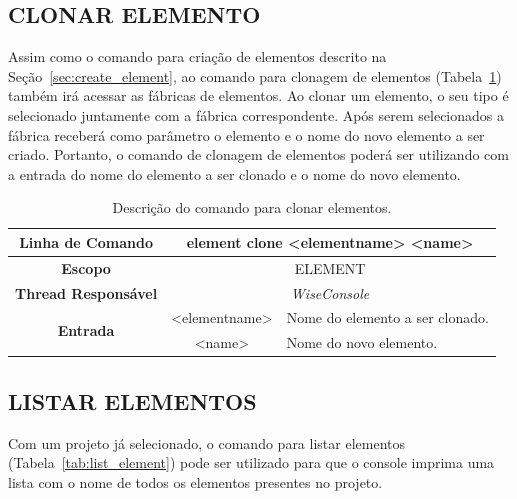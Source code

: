 \subsection{CLONAR ELEMENTO}\label{sec:clone_element}

Assim como o comando para criação de elementos descrito na Seção~\ref{sec:create_element}, ao comando para clonagem de elementos (Tabela~\ref{tab:clone_element}) também irá acessar as fábricas de elementos. Ao clonar um elemento, o seu tipo é selecionado juntamente com a fábrica correspondente. Após serem selecionados a fábrica receberá como parâmetro o elemento e o nome do novo elemento a ser criado. Portanto, o comando de clonagem de elementos poderá ser utilizando com a entrada do nome do elemento a ser clonado e o nome do novo elemento.

\begin{center}
	\begin{table}[!htbp]
		\begin{tabularx}{\textwidth}{c|c|X}
			\toprule
			\textbf{Linha de Comando} & \multicolumn{2}{c}{element clone <element\underline{\space\space}name> <name>} \\
			\midrule
			\textbf{Escopo} & \multicolumn{2}{c}{ELEMENT} \\
			\hline
			\textbf{Thread Responsável} & \multicolumn{2}{c}{\textit{WiseConsole}} \\
			\hline
			\multirow{2}{*}{\textbf{Entrada}} & <element\underline{\space\space}name> & Nome do elemento a ser clonado. \\
			
			& <name> & Nome do novo elemento. \\
			\bottomrule
		\end{tabularx}
		\caption{Descrição do comando para clonar elementos.}
		\label{tab:clone_element}
	\end{table}
\end{center}

\subsection{LISTAR ELEMENTOS}\label{sec:list_element}

Com um projeto já selecionado, o comando para listar elementos (Tabela~\ref{tab:list_element}) pode ser utilizado para que o console imprima uma lista com o nome de todos os elementos presentes no projeto.

